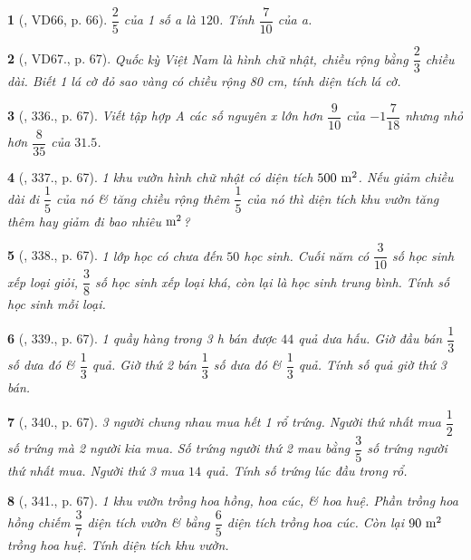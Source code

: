 \documentclass{article}
\newtheorem{baitoan}{}
\begin{document}
\begin{baitoan}[\cite{Tuyen_Toan_6}, VD66, p. 66]
	$\dfrac{2}{5}$ của 1 số a là $120$. Tính $\dfrac{7}{10}$ của a.
\end{baitoan}

\begin{baitoan}[\cite{Tuyen_Toan_6}, VD67., p. 67]
	Quốc kỳ Việt Nam là hình chữ nhật, chiều rộng bằng $\dfrac{2}{3}$ chiều dài. Biết 1 lá cờ đỏ sao vàng có chiều rộng {\rm80 cm}, tính diện tích lá cờ.
\end{baitoan}

\begin{baitoan}[\cite{Tuyen_Toan_6}, 336., p. 67]
	Viết tập hợp A các số nguyên x lớn hơn $\dfrac{9}{10}$ của $-1\dfrac{7}{18}$ nhưng nhỏ hơn $\dfrac{8}{35}$ của $31.5$.
\end{baitoan}

\begin{baitoan}[\cite{Tuyen_Toan_6}, 337., p. 67]
	1 khu vườn hình chữ nhật có diện tích $\rm500\ m^2$. Nếu giảm chiều dài đi $\dfrac{1}{5}$ của nó \& tăng chiều rộng thêm $\dfrac{1}{5}$ của nó thì diện tích khu vườn tăng thêm hay giảm đi bao nhiêu $\rm m^2$?
\end{baitoan}

\begin{baitoan}[\cite{Tuyen_Toan_6}, 338., p. 67]
	1 lớp học có chưa đến $50$ học sinh. Cuối năm có $\dfrac{3}{10}$ số học sinh xếp loại giỏi, $\dfrac{3}{8}$ số học sinh xếp loại khá, còn lại là học sinh trung bình. Tính số học sinh mỗi loại.
\end{baitoan}

\begin{baitoan}[\cite{Tuyen_Toan_6}, 339., p. 67]
	1 quầy hàng trong {\rm3 h} bán được $44$ quả dưa hấu. Giờ đầu bán $\dfrac{1}{3}$ số dưa đó \& $\dfrac{1}{3}$ quả. Giờ thứ 2 bán $\dfrac{1}{3}$ số dưa đó \& $\dfrac{1}{3}$ quả. Tính số quả giờ thứ 3 bán.
\end{baitoan}

\begin{baitoan}[\cite{Tuyen_Toan_6}, 340., p. 67]
	3 người chung nhau mua hết 1 rổ trứng. Người thứ nhất mua $\dfrac{1}{2}$ số trứng mà 2 người kia mua. Số trứng người thứ 2 mau bằng $\dfrac{3}{5}$ số trứng người thứ nhất mua. Người thứ 3 mua $14$ quả. Tính số trứng lúc đầu trong rổ.
\end{baitoan}

\begin{baitoan}[\cite{Tuyen_Toan_6}, 341., p. 67]
	1 khu vườn trồng hoa hồng, hoa cúc, \& hoa huệ. Phần trồng hoa hồng chiếm $\dfrac{3}{7}$ diện tích vườn \& bằng $\dfrac{6}{5}$ diện tích trồng hoa cúc. Còn lại $\rm90\ m^2$ trồng hoa huệ. Tính diện tích khu vườn.
\end{baitoan}
\end{document}
